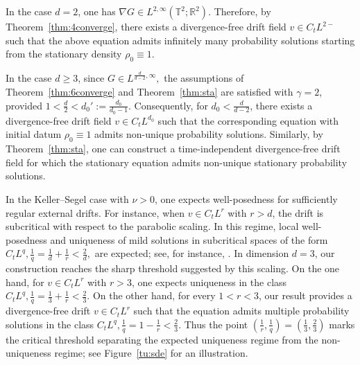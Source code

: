 \documentclass[UTF-8,reqno]{amsart}
\numberwithin{equation}{section}
\theoremstyle{definition}
\def\geq{\geqslant}
\def\geq{\geqslant}
\begin{document}
In the case $d=2$, one has
$
\nabla G\in L^{2,\infty}(\mathbb{T}^2;\mathbb{R}^2).
$
Therefore, by Theorem~\ref{thm:4converge}, there exists a divergence-free
drift field
$
v\in C_tL^{2-} 
$
such that the above equation admits infinitely many probability solutions
starting from the stationary density $\rho_0\equiv1$.

In the case $d\geq 3$,   since
$
G\in L^{\frac{d}{d-2},\infty},
$   the assumptions of
Theorem~\ref{thm:6converge} and Theorem~\ref{thm:sta} are satisfied with
$\gamma=2$, provided
$
1<\frac{d}{2}<d_0':=\frac{d_0}{d_0-1}$.
Consequently, for  $d_0<\frac{d}{d-2}$, there exists a
divergence-free drift field
$
v\in C_tL^{d_0} 
$
such that the corresponding equation with initial datum $\rho_0\equiv1$
admits non-unique probability solutions. Similarly, by
Theorem~\ref{thm:sta}, one can construct a time-independent divergence-free
drift field for which the stationary equation admits non-unique stationary
probability solutions.

In the Keller--Segel case with $\nu>0$, one expects well-posedness for
sufficiently regular external drifts. For instance, when
$v\in C_tL^r$ with $r>d$, the drift is
subcritical with respect to the parabolic scaling. In this regime, local
well-posedness and uniqueness of mild solutions in subcritical spaces of the
form $
C_tL^q,
\frac1q=\frac1d+\frac1r<\frac2d,
$
are expected; see, for instance, \cite{Kar99,BHN94}.
In dimension $d=3$, our construction reaches the sharp threshold suggested by
this scaling. On the one hand, for $v\in C_tL^r$ with $r>3$, one expects
uniqueness in the class
$
C_tL^q,
\frac1q=\frac13+\frac1r<\frac23 .
$
On the other hand, for every $1<r<3$, our result provides a divergence-free
drift $
v\in C_tL^r$ 
such that the equation admits multiple probability solutions in the class
$
C_tL^q,
\frac1q=1-\frac1r<\frac23 .
$
Thus the point
$
\left(\frac1r,\frac1q\right)
=
\left(\frac13,\frac23\right)
$
marks the critical threshold separating the expected uniqueness regime from
the non-uniqueness regime; see Figure~\ref{tu:sde} for an illustration.
 
\end{document}
